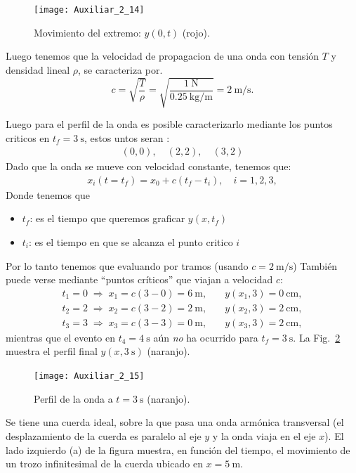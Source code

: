 \documentclass[
  11pt,
  letterpaper,
   addpoints,
  ]{exam}
\begin{document}
\begin{questions}
\begin{solution}
\begin{figure}[H]
  \centering
  \texttt{[image: Auxiliar\_2\_14]}
  \caption{Movimiento del extremo: $y(0,t)$ (rojo).}
  \label{fig:y0t}
\end{figure}
Luego tenemos que la velocidad de propagacion de una onda con tensión $T$ y densidad lineal $\rho$, se caracteriza por.
\begin{equation}
c=\sqrt{\frac{T}{\rho}}
=\sqrt{\frac{1~\text{N}}{0.25~\text{kg/m}}}
=2~\text{m/s}.
\label{eq:c}
\end{equation}

Luego para el perfil de la onda es posible caracterizarlo mediante los puntos criticos en $t_f=3~\text{s}$, estos untos seran :
\begin{align}
  (0,0),\quad (2,2),\quad (3,2)
\end{align}
Dado que la onda se mueve con velocidad constante, tenemos que:
\begin{align}
  x_{i}(t=t_f)=x_0+c(t_f-t_i),\quad i=1,2,3,
\end{align}
Donde tenemos que 
\begin{itemize}
  \item $t_{f}$: es el tiempo que queremos graficar $y(x,t_{f})$
  \item $t_{i}$: es el tiempo en que se alcanza el punto critico $i$
\end{itemize}
Por lo tanto tenemos que evaluando por tramos (usando $c=2~\text{m/s}$)
También puede verse mediante ``puntos críticos'' que viajan a velocidad $c$:
\begin{align}
t_1=0 \;\Rightarrow\; x_1=c(3-0)=6~\text{m},\quad & y(x_1,3)=0~\text{cm},\\
t_2=2 \;\Rightarrow\; x_2=c(3-2)=2~\text{m},\quad & y(x_2,3)=2~\text{cm},\\
t_3=3 \;\Rightarrow\; x_3=c(3-3)=0~\text{m},\quad & y(x_3,3)=2~\text{cm},
\end{align}
mientras que el evento en $t_4=4~\text{s}$ aún \emph{no} ha ocurrido para $t_f=3~\text{s}$.
La Fig.~\ref{fig:perfil} muestra el perfil final $y(x,3~\text{s})$ (naranjo).

\begin{figure}[H]
  \centering
  \texttt{[image: Auxiliar\_2\_15]}
  \caption{Perfil de la onda a $t=3~\text{s}$ (naranjo).}
  \label{fig:perfil}
\end{figure}

\end{solution}

\question Se tiene una cuerda ideal, sobre la que pasa una onda armónica transversal (el desplazamiento de la cuerda es paralelo al eje $y$ y la onda viaja en el eje $x$). El lado izquierdo (a) de la figura muestra, en función del tiempo, el movimiento de un trozo infinitesimal de la cuerda ubicado en $x=5~\text{m}$.


\end{questions}
\end{document}
